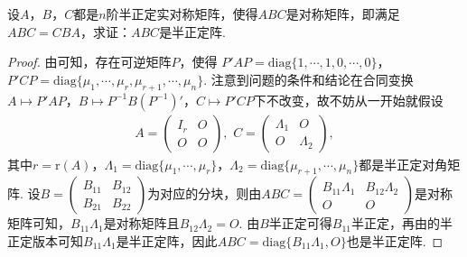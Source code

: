 \documentclass[../../main.tex]{subfiles}%
\begin{document}
\begin{proposition}\label{proposition:两个半正定阵可同时合同对角化4}
设\(A\)，\(B\)，\(C\)都是\(n\)阶半正定实对称矩阵，使得\(ABC\)是对称矩阵，即满足\(ABC = CBA\)，求证：\(ABC\)是半正定阵.
\end{proposition}
\begin{proof}
由可知，存在可逆矩阵\(P\)，使得
\(P'AP = \mathrm{diag}\{1,\cdots,1,0,\cdots,0\}\)，\(P'CP = \mathrm{diag}\{\mu_1,\cdots,\mu_r,\mu_{r + 1},\cdots,\mu_n\}\).
注意到问题的条件和结论在合同变换\(A\mapsto P'AP\)，\(B\mapsto P^{-1}B(P^{-1})'\)，\(C\mapsto P'CP\)下不改变，故不妨从一开始就假设
\begin{align*}
A=\begin{pmatrix}I_r&O\\O&O\end{pmatrix},\,\,C=\begin{pmatrix}\Lambda_1&O\\O&\Lambda_2\end{pmatrix},
\end{align*}
其中\(r = \mathrm{r}(A)\)，\(\Lambda_1 = \mathrm{diag}\{\mu_1,\cdots,\mu_r\}\)，\(\Lambda_2 = \mathrm{diag}\{\mu_{r + 1},\cdots,\mu_n\}\)都是半正定对角矩阵. 设\(B=\begin{pmatrix}B_{11}&B_{12}\\B_{21}&B_{22}\end{pmatrix}\)为对应的分块，则由\(ABC=\begin{pmatrix}B_{11}\Lambda_1&B_{12}\Lambda_2\\O&O\end{pmatrix}\)是对称矩阵可知，\(B_{11}\Lambda_1\)是对称矩阵且\(B_{12}\Lambda_2 = O\). 由\(B\)半正定可得\(B_{11}\)半正定，再由的半正定版本可知\(B_{11}\Lambda_1\)是半正定阵，因此\(ABC = \mathrm{diag}\{B_{11}\Lambda_1,O\}\)也是半正定阵. 
\end{proof}
\end{document}

